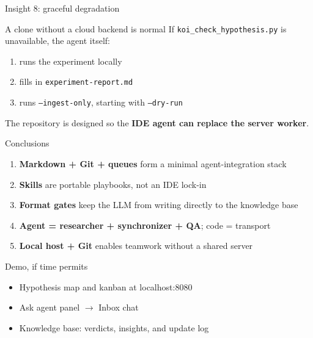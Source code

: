 \documentclass[aspectratio=169,11pt]{beamer}
\begin{document}
\begin{frame}{Insight 8: graceful degradation}
  \begin{block}{A clone without a cloud backend is normal}
    If \texttt{koi\_check\_hypothesis.py} is unavailable, the agent itself:
  \end{block}
  \begin{enumerate}
    \item runs the experiment locally
    \item fills in \texttt{experiment-report.md}
    \item runs \texttt{--ingest-only}, starting with \texttt{--dry-run}
  \end{enumerate}
  The repository is designed so the \textbf{IDE agent can replace the server worker}.
\end{frame}

\begin{frame}{Conclusions}
  \begin{enumerate}
    \item \textbf{Markdown + Git + queues} form a minimal agent-integration stack
    \item \textbf{Skills} are portable playbooks, not an IDE lock-in
    \item \textbf{Format gates} keep the LLM from writing directly to the knowledge base
    \item \textbf{Agent = researcher + synchronizer + QA}; code = transport
    \item \textbf{Local host + Git} enables teamwork without a shared server
  \end{enumerate}
\end{frame}

\begin{frame}{Demo, if time permits}
  \begin{itemize}
    \item Hypothesis map and kanban at localhost:8080
    \item Ask agent panel $\rightarrow$ Inbox chat
    \item Knowledge base: verdicts, insights, and update log
  \end{itemize}
\end{frame}
\end{document}
